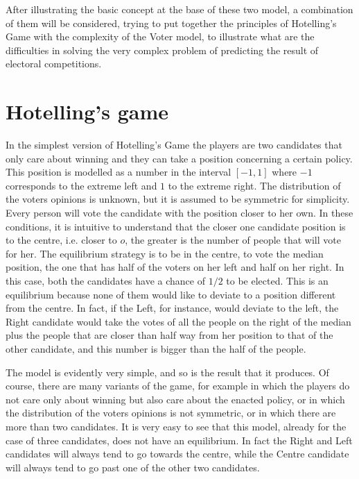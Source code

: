 \documentclass[11pt,a4paper,twocolumn]{article}
\begin{document}
After illustrating the basic concept at the base of these two model, a combination of them will be considered, trying to put together the principles of Hotelling's Game with the complexity of the Voter model, to illustrate what are the difficulties in solving the very complex problem of predicting the result of electoral competitions.

\vspace{-15pt}
\section{Hotelling's game}
\vspace{-10pt}
In the simplest version of Hotelling's Game the players are two candidates that only care about winning and they can take a position concerning a certain policy. This position is modelled as a number in the interval $[-1,1]$ where $-1$ corresponds to the extreme left and $1$ to the extreme right. The distribution of the voters opinions is unknown, but it is assumed to be symmetric for simplicity. Every person will vote the candidate with the position closer to her own. In these conditions, it is intuitive to understand that the closer one candidate position is to the centre, i.e. closer to $o$, the greater is the number of people that will vote for her. 
The equilibrium strategy is to be in the centre, to vote the median position, the one that has half of the voters on her left and half on her right. 
In this case, both the candidates have a chance of $1/2$ to be elected. This is an equilibrium because none of them would like to deviate to a position different from the centre. In fact, if the Left, for instance, would deviate to the left, the Right candidate would take the votes of all the people on the right of the median plus the people that are closer than half way from her position to that of the other candidate, and this number is bigger than the half of the people.

The model is evidently very simple, and so is the result that it produces. Of course, there are many variants of the game, for example in which the players do not care only about winning but also care about the enacted policy, or in which the distribution of the voters opinions is not symmetric, or in which there are more than two candidates. It is very easy to see that this model, already for the case of three candidates, does not have an equilibrium. In fact the Right and Left candidates will always tend to go towards the centre, while the Centre candidate will always tend to go past one of the other two candidates.
\vspace{-15pt}
\end{document}
